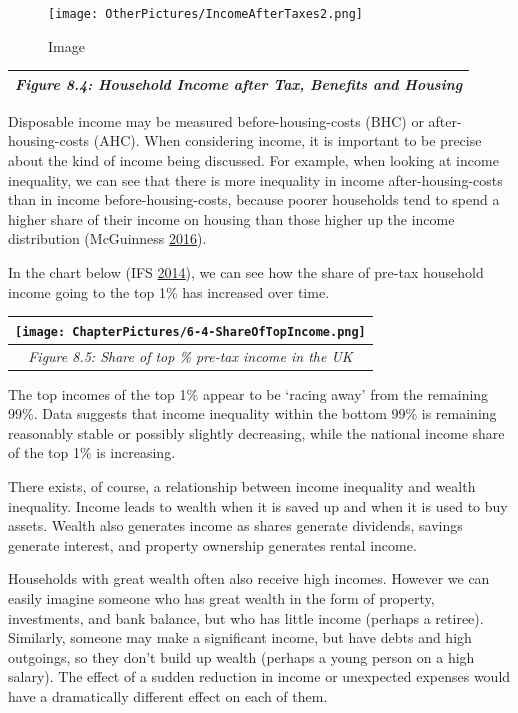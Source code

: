 \documentclass[]{tufte-handout}
\begin{document}
\begin{figure}
\centering
\texttt{[image: OtherPictures/IncomeAfterTaxes2.png]}
\caption{Image}
\end{figure}

\begin{longtable}[]{@{}c@{}}
\toprule
\endhead
\emph{Figure 8.4: Household Income after Tax, Benefits and
Housing}\tabularnewline
\bottomrule
\end{longtable}

Disposable income may be measured before-housing-costs (BHC) or
after-housing-costs (AHC). When considering income, it is important to
be precise about the kind of income being discussed. For example, when
looking at income inequality, we can see that there is more inequality
in income after-housing-costs than in income before-housing-costs,
because poorer households tend to spend a higher share of their income
on housing than those higher up the income distribution (McGuinness
\protect\hyperlink{ref-McGuinness2016}{2016}).

In the chart below (IFS \protect\hyperlink{ref-IFS2014}{2014}), we can
see how the share of pre-tax household income going to the top 1\% has
increased over time.

\begin{longtable}[]{@{}c@{}}
\toprule
\texttt{[image: ChapterPictures/6-4-ShareOfTopIncome.png]}\tabularnewline
\midrule
\endhead
\emph{Figure 8.5: Share of top \% pre-tax income in the
UK}\tabularnewline
\bottomrule
\end{longtable}

The top incomes of the top 1\% appear to be `racing away' from the
remaining 99\%. Data suggests that income inequality within the bottom
99\% is remaining reasonably stable or possibly slightly decreasing,
while the national income share of the top 1\% is increasing.

There exists, of course, a relationship between income inequality and
wealth inequality. Income leads to wealth when it is saved up and when
it is used to buy assets. Wealth also generates income as shares
generate dividends, savings generate interest, and property ownership
generates rental income.

Households with great wealth often also receive high incomes. However we
can easily imagine someone who has great wealth in the form of property,
investments, and bank balance, but who has little income (perhaps a
retiree). Similarly, someone may make a significant income, but have
debts and high outgoings, so they don't build up wealth (perhaps a young
person on a high salary). The effect of a sudden reduction in income or
unexpected expenses would have a dramatically different effect on each
of them.
\end{document}
